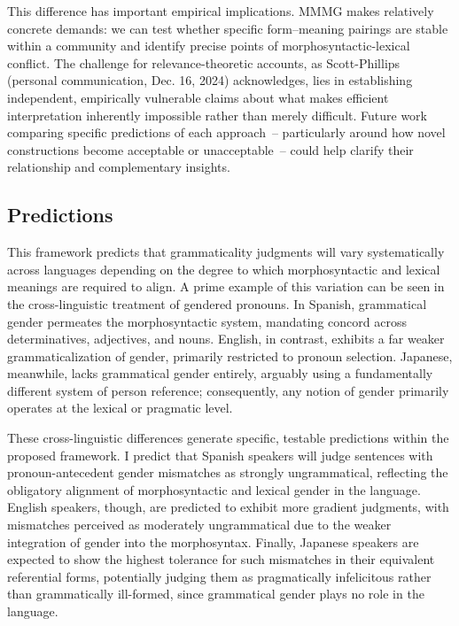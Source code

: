 \documentclass[12pt,letterpaper]{article}
\begin{document}
This difference has important empirical implications. MMMG makes relatively concrete demands: we can test whether specific form--meaning pairings are stable within a community and identify precise points of morphosyntactic-lexical conflict. The challenge for relevance-theoretic accounts, as Scott-Phillips (personal communication, Dec. 16, 2024) acknowledges, lies in establishing independent, empirically vulnerable claims about what makes efficient interpretation inherently impossible rather than merely difficult. Future work comparing specific predictions of each approach~-- particularly around how novel constructions become acceptable or unacceptable~-- could help clarify their relationship and complementary insights.

\subsection{Predictions}

This framework predicts that grammaticality judgments will vary systematically across languages depending on the degree to which morphosyntactic and lexical meanings are required to align. A prime example of this variation can be seen in the cross-linguistic treatment of gendered pronouns. In Spanish, grammatical gender permeates the morphosyntactic system, mandating concord across determinatives, adjectives, and nouns. English, in contrast, exhibits a far weaker grammaticalization of gender, primarily restricted to pronoun selection. Japanese, meanwhile, lacks grammatical gender entirely, arguably using a fundamentally different system of person reference; consequently, any notion of gender primarily operates at the lexical or pragmatic level.

These cross-linguistic differences generate specific, testable predictions within the proposed framework.  I predict that Spanish speakers will judge sentences with pronoun-antecedent gender mismatches as strongly ungrammatical, reflecting the obligatory alignment of morphosyntactic and lexical gender in the language. English speakers, though, are predicted to exhibit more gradient judgments, with mismatches perceived as moderately ungrammatical due to the weaker integration of gender into the morphosyntax. Finally, Japanese speakers are expected to show the highest tolerance for such mismatches in their equivalent referential forms, potentially judging them as pragmatically infelicitous rather than grammatically ill-formed, since grammatical gender plays no role in the language.
\end{document}
